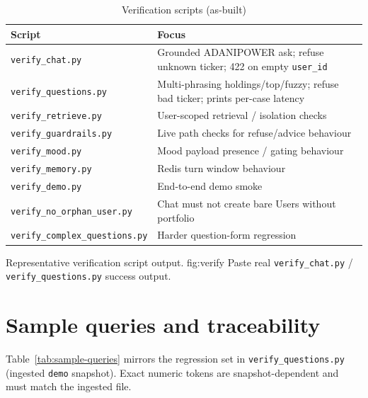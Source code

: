\begin{table}[!htbp]
\centering
\small
\caption{Verification scripts (as-built)}
\label{tab:verify-scripts}
\begin{tabularx}{\textwidth}{@{}
  >{\raggedright\arraybackslash}p{}
  >{\raggedright\arraybackslash}X
  @{}}
\toprule
\textbf{Script} & \textbf{Focus} \\
\midrule
\texttt{verify\_chat.py} & Grounded ADANIPOWER ask; refuse unknown ticker; 422 on empty \texttt{user\_id} \\
\addlinespace
\texttt{verify\_questions.py} & Multi-phrasing holdings/top/fuzzy; refuse bad ticker; prints per-case latency \\
\addlinespace
\texttt{verify\_retrieve.py} & User-scoped retrieval / isolation checks \\
\addlinespace
\texttt{verify\_guardrails.py} & Live path checks for refuse/advice behaviour \\
\addlinespace
\texttt{verify\_mood.py} & Mood payload presence / gating behaviour \\
\addlinespace
\texttt{verify\_memory.py} & Redis turn window behaviour \\
\addlinespace
\texttt{verify\_demo.py} & End-to-end demo smoke \\
\addlinespace
\texttt{verify\_no\_orphan\_user.py} & Chat must not create bare Users without portfolio \\
\addlinespace
\texttt{verify\_complex\_questions.py} & Harder question-form regression \\
\bottomrule
\end{tabularx}
\end{table}

%
{Representative verification script output.}%
{fig:verify}%
{Paste real \texttt{verify\_chat.py} / \texttt{verify\_questions.py} success output.}

\section{Sample queries and traceability}

Table~\ref{tab:sample-queries} mirrors the regression set in \texttt{verify\_questions.py} (ingested \texttt{demo} snapshot). Exact numeric tokens are snapshot-dependent and must match the ingested file.

